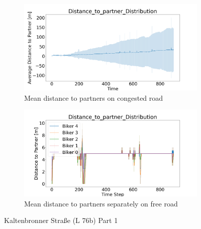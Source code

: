 \begin{figure}[H]
\begin{subfigure}[b]{0.45\textwidth}
        \centering
        \includegraphics[width=1.0\textwidth]{images/Kaltenbronner/Kaltenbronner_AVG_Distance_to_partner_distribution_congested.png}
        \caption{Mean distance to partners on congested road}
    \end{subfigure}
    \hfill
    \begin{subfigure}[b]{0.45\textwidth}
        \centering
        \includegraphics[width=1.0\textwidth]{images/Kaltenbronner/Kaltenbronner _Distance_to_partner_distribution_free.png}
        \caption{Mean distance to partners separately on free road}
    \end{subfigure}
    \caption{Kaltenbronner Straße (L 76b) Part 1}
\end{figure}

